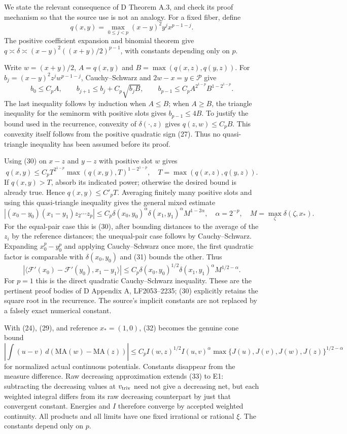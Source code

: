 \documentclass[
  10pt,
]{article}
\begin{document}
We state the relevant consequence of D Theorem A.3, and check its proof
mechanism so that the source use is not an analogy. For a fixed fiber,
define \[q(x,y)=\max_{0\le j<p}(x-y)^2y^jx^{p-1-j}.\] The positive
coefficient expansion and binomial theorem give
\(q\asymp\delta\asymp(x-y)^2((x+y)/2)^{p-1}\), with constants depending
only on \(p\).

Write \(w=(x+y)/2\), \(A=q(x,y)\) and \(B=\max(q(x,z),q(y,z))\). For
\(b_j=(x-y)^2z^jw^{p-1-j}\), Cauchy--Schwarz and \(2w-x=y\in\mathcal P\)
give \[b_0\le C_pA,\qquad b_{j+1}\le b_j+C_p\sqrt{b_jB},\qquad
 b_{p-1}\le C_pA^{2^{1-p}}B^{1-2^{1-p}}. \tag{30}\] The last inequality
follows by induction when \(A\le B\); when \(A\ge B\), the triangle
inequality for the seminorm with positive slots gives \(b_{p-1}\le4B\).
To justify the bound used in the recurrence, convexity of
\(\delta(\cdot,z)\) gives \(q(z,w)\le C_pB\). This convexity itself
follows from the positive quadratic sign (27). Thus no quasi-triangle
inequality has been assumed before its proof.

Using (30) on \(x-z\) and \(y-z\) with positive slot \(w\) gives
\[q(x,y)\le C_pT^{2^{1-p}}\max(q(x,y),T)^{1-2^{1-p}},\quad
 T=\max(q(x,z),q(y,z)).\] If \(q(x,y)>T\), absorb its indicated power;
otherwise the desired bound is already true. Hence \(q(x,y)\le C'_pT\).
Averaging finitely many positive slots and using this quasi-triangle
inequality gives the general mixed estimate
\[|(x_0-y_0)(x_1-y_1)z_2\cdots z_p|
 \le C_p\delta(x_0,y_0)^\alpha\delta(x_1,y_1)^\alpha M^{1-2\alpha},
 \quad \alpha=2^{-p},\quad M=\max_\zeta\delta(\zeta,x_*). \tag{31}\] For
the equal-pair case this is (30), after bounding distances to the
average of the \(z_i\) by the reference distances; the unequal-pair case
follows by Cauchy--Schwarz. Expanding \(x_0^p-y_0^p\) and applying
Cauchy--Schwarz once more, the first quadratic factor is comparable with
\(\delta(x_0,y_0)\) and (31) bounds the other. Thus \[
 |\langle\mathcal F'(x_0)-\mathcal F'(y_0),x_1-y_1\rangle|
 \le C_p\delta(x_0,y_0)^{1/2}\delta(x_1,y_1)^\alpha M^{1/2-\alpha}.
 \tag{32}
\] For \(p=1\) this is the direct quadratic Cauchy--Schwarz inequality.
These are the pertinent proof bodies of D Appendix A, LF2053--2235; (30)
explicitly retains the square root in the recurrence. The source's
implicit constants are not replaced by a falsely exact numerical
constant.

With (24), (29), and reference \(x_*=(1,0)\), (32) becomes the genuine
cone bound \[
 \left|\int(u-v)\,d(\mathrm{MA}(w)-\mathrm{MA}(z))\right|
 \le C_p I(w,z)^{1/2}I(u,v)^\alpha
       \max\{J(u),J(v),J(w),J(z)\}^{1/2-\alpha}
 \tag{33}
\] for normalized actual continuous potentials. Constants disappear from
the measure difference. Raw decreasing approximation extends (33) to E1:
subtracting the decreasing values at \(v_{\rm triv}\) need not give a
decreasing net, but each weighted integral differs from its raw
decreasing counterpart by just that convergent constant. Energies and
\(I\) therefore converge by accepted weighted continuity. All products
and all limits have one fixed irrational or rational \(\xi\). The
constants depend only on \(p\).
\end{document}

